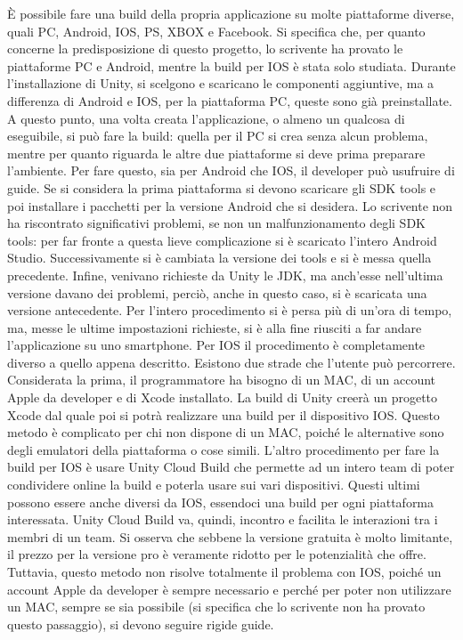 È possibile fare una build della propria applicazione su molte piattaforme diverse, quali PC, Android, IOS, PS, XBOX e Facebook. Si specifica che, per quanto concerne la predisposizione di questo progetto, lo scrivente ha provato le piattaforme PC e Android, mentre la build per IOS è stata solo studiata.
Durante l’installazione di Unity, si scelgono e scaricano le componenti aggiuntive, ma a differenza di Android e IOS, per la piattaforma PC, queste sono già preinstallate.
A questo punto, una volta creata l’applicazione, o almeno un qualcosa di eseguibile, si può fare la build: quella per il PC si crea senza alcun problema, mentre per quanto riguarda le altre due piattaforme si deve prima preparare l’ambiente. Per fare questo, sia per Android che IOS, il developer può usufruire di guide.
Se si considera la prima piattaforma si devono scaricare gli SDK tools e poi installare i pacchetti per la versione Android che si desidera. Lo scrivente non ha riscontrato significativi problemi, se non un malfunzionamento degli SDK tools: per far fronte a questa lieve complicazione si è scaricato l’intero Android Studio. Successivamente si è cambiata la versione dei tools e si è messa quella precedente. Infine, venivano richieste da Unity le JDK, ma anch’esse nell’ultima versione davano dei problemi, perciò, anche in questo caso, si è scaricata una versione antecedente. Per l’intero procedimento si è persa più di un’ora di tempo, ma, messe le ultime impostazioni richieste, si è alla fine riusciti a far andare l’applicazione su uno smartphone.
Per IOS il procedimento è completamente diverso a quello appena descritto. Esistono due strade che l’utente può percorrere.
Considerata la prima, il programmatore ha bisogno di un MAC, di un account Apple da developer e di Xcode installato. La build di Unity creerà un progetto Xcode dal quale poi si potrà realizzare una build per il dispositivo IOS. Questo metodo è complicato per chi non dispone di un MAC, poiché le alternative sono degli emulatori della piattaforma o cose simili.
L’altro procedimento per fare la build per IOS è usare Unity Cloud Build che permette ad un intero team di poter condividere online la build e poterla usare sui vari dispositivi. Questi ultimi possono essere anche diversi da IOS, essendoci una build per ogni piattaforma interessata. Unity Cloud Build va, quindi, incontro e facilita le interazioni tra i membri di un team. Si osserva che sebbene la versione gratuita è molto limitante, il prezzo per la versione pro è veramente ridotto per le potenzialità che offre. Tuttavia, questo metodo non risolve totalmente il problema con IOS, poiché un account Apple da developer è sempre necessario e perché per poter non utilizzare un MAC, sempre se sia possibile (si specifica che lo scrivente non ha provato questo passaggio), si devono seguire rigide guide.


